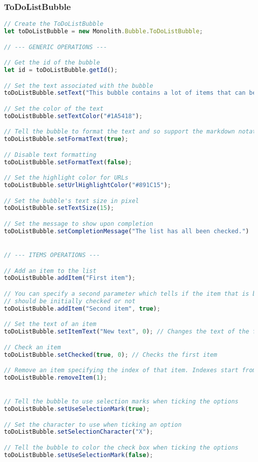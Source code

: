 \subsubsection{ToDoListBubble}
\begin{lstlisting}[language=JavaScript]
// Create the ToDoListBubble
let toDoListBubble = new Monolith.Bubble.ToDoListBubble;

// --- GENERIC OPERATIONS ---

// Get the id of the bubble
let id = toDoListBubble.getId();

// Set the text associated with the bubble
toDoListBubble.setText("This bubble contains a lot of items that can be checked");

// Set the color of the text
toDoListBubble.setTextColor("#1A5418");

// Tell the bubble to format the text and so support the markdown notation
toDoListBubble.setFormatText(true);

// Disable text formatting
toDoListBubble.setFormatText(false);

// Set the highlight color for URLs
toDoListBubble.setUrlHighlightColor("#891C15");

// Set the bubble's text size in pixel
toDoListBubble.setTextSize(15);

// Set the message to show upon completion 
toDoListBubble.setCompletionMessage("The list has all been checked.")


// --- ITEMS OPERATIONS ---

// Add an item to the list
toDoListBubble.addItem("First item");

// You can specify a second parameter which tells if the item that is being added
// should be initially checked or not
toDoListBubble.addItem("Second item", true); 

// Set the text of an item
toDoListBubble.setItemText("New text", 0); // Changes the text of the first item

// Check an item
toDoListBubble.setChecked(true, 0); // Checks the first item

// Remove an item specifying the index of that item. Indexes start from 0
toDoListBubble.removeItem(1);


// Tell the bubble to use selection marks when ticking the options
toDoListBubble.setUseSelectionMark(true);

// Set the character to use when ticking an option
toDoListBubble.setSelectionCharacter("X");

// Tell the bubble to color the check box when ticking the options
toDoListBubble.setUseSelectionMark(false);


\end{lstlisting}
